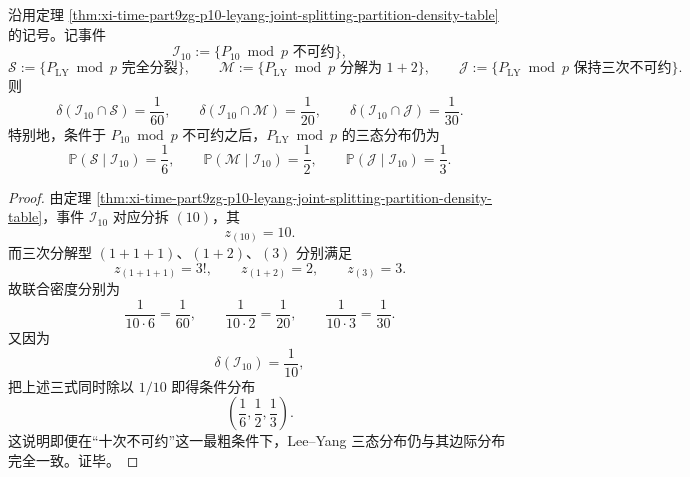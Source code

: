 \begin{corollary}\label{cor:xi-time-part9zg-p10-irreducible-leyang-tristate-independence}
沿用定理 \ref{thm:xi-time-part9zg-p10-leyang-joint-splitting-partition-density-table} 的记号。记事件
\[
\mathcal I_{10}:=\{\text{\(P_{10}\bmod p\) 不可约}\},
\]
\[
\mathcal S:=\{\text{\(P_{\mathrm{LY}}\bmod p\) 完全分裂}\},
\qquad
\mathcal M:=\{\text{\(P_{\mathrm{LY}}\bmod p\) 分解为 \(1+2\)}\},
\qquad
\mathcal J:=\{\text{\(P_{\mathrm{LY}}\bmod p\) 保持三次不可约}\}.
\]
则
\[
\delta(\mathcal I_{10}\cap \mathcal S)=\frac{1}{60},
\qquad
\delta(\mathcal I_{10}\cap \mathcal M)=\frac{1}{20},
\qquad
\delta(\mathcal I_{10}\cap \mathcal J)=\frac{1}{30}.
\]
特别地，条件于 \(P_{10}\bmod p\) 不可约之后，\(P_{\mathrm{LY}}\bmod p\) 的三态分布仍为
\[
\boxed{\;
\mathbb P(\mathcal S\mid \mathcal I_{10})=\frac16,
\qquad
\mathbb P(\mathcal M\mid \mathcal I_{10})=\frac12,
\qquad
\mathbb P(\mathcal J\mid \mathcal I_{10})=\frac13.\;}
\]
\end{corollary}
\begin{proof}
由定理 \ref{thm:xi-time-part9zg-p10-leyang-joint-splitting-partition-density-table}，事件 \(\mathcal I_{10}\) 对应分拆 \((10)\)，其
\[
z_{(10)}=10.
\]
而三次分解型 \((1+1+1)\)、\((1+2)\)、\((3)\) 分别满足
\[
z_{(1+1+1)}=3!,
\qquad
z_{(1+2)}=2,
\qquad
z_{(3)}=3.
\]
故联合密度分别为
\[
\frac{1}{10\cdot 6}=\frac{1}{60},
\qquad
\frac{1}{10\cdot 2}=\frac{1}{20},
\qquad
\frac{1}{10\cdot 3}=\frac{1}{30}.
\]
又因为
\[
\delta(\mathcal I_{10})=\frac{1}{10},
\]
把上述三式同时除以 \(1/10\) 即得条件分布
\[
\left(\frac16,\frac12,\frac13\right).
\]
这说明即便在“十次不可约”这一最粗条件下，Lee--Yang 三态分布仍与其边际分布完全一致。证毕。
\end{proof}

